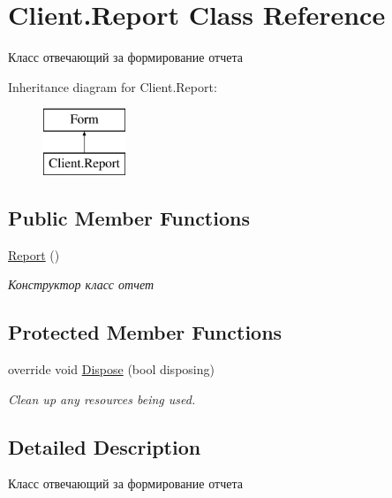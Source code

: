 \hypertarget{class_client_1_1_report}{}\section{Client.\+Report Class Reference}
\label{class_client_1_1_report}


Класс отвечающий за формирование отчета  


Inheritance diagram for Client.\+Report\+:\begin{figure}[H]
\begin{center}
\leavevmode
\includegraphics[height=2.000000cm]{class_client_1_1_report}
\end{center}
\end{figure}
\subsection*{Public Member Functions}
\begin{DoxyCompactItemize}
\item 
\hyperlink{class_client_1_1_report_a5982d06a4b2fb26073d40133ebf9deb0}{Report} ()
\begin{DoxyCompactList}\small\item\em Конструктор класс отчет \end{DoxyCompactList}\end{DoxyCompactItemize}
\subsection*{Protected Member Functions}
\begin{DoxyCompactItemize}
\item 
override void \hyperlink{class_client_1_1_report_a83e48fbf05f481d9cbb66f4700131ff6}{Dispose} (bool disposing)
\begin{DoxyCompactList}\small\item\em Clean up any resources being used. \end{DoxyCompactList}\end{DoxyCompactItemize}


\subsection{Detailed Description}
Класс отвечающий за формирование отчета 



